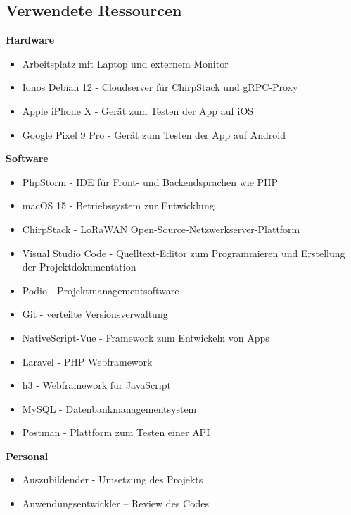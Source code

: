 \subsection{Verwendete Ressourcen}
\label{app:Ressourcen}

\textbf{Hardware}

\begin{itemize}
    \item Arbeitsplatz mit Laptop und externem Monitor
    \item Ionos Debian 12 - Cloudserver für ChirpStack und gRPC-Proxy
    \item Apple iPhone X - Gerät zum Testen der App auf iOS
    \item Google Pixel 9 Pro - Gerät zum Testen der App auf Android
\end{itemize}


\textbf{Software}

\begin{itemize}
    \item PhpStorm - \ac{IDE} für Front- und Backendsprachen wie \zB PHP
    \item macOS 15 - Betriebssystem zur Entwicklung
    \item ChirpStack - \ac{LoRaWAN} Open-Source-Netzwerkserver-Plattform
    \item Visual Studio Code - Quelltext-Editor zum Programmieren und Erstellung der Projektdokumentation
    \item Podio - Projektmanagementsoftware
    \item Git - verteilte Versionsverwaltung
    \item NativeScript-Vue - Framework zum Entwickeln von Apps
    \item Laravel - \ac{PHP} Webframework
    \item h3 - Webframework für JavaScript
    \item MySQL - Datenbankmanagementsystem
    \item Postman - Plattform zum Testen einer \ac{API}
\end{itemize}

\textbf{Personal}

\begin{itemize}
    \item Auszubildender - Umsetzung des Projekts
    \item Anwendungsentwickler – Review des Codes
\end{itemize}